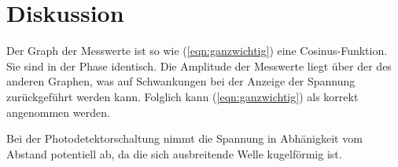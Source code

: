 \section{Diskussion}
\label{sec:Diskussion}

Der Graph der Messwerte ist so wie (\ref{eqn:ganzwichtig}) eine Cosinus-Funktion. Sie sind in der Phase identisch. Die Amplitude der Messwerte liegt über der des anderen Graphen, was auf Schwankungen bei der Anzeige der Spannung zurückgeführt werden kann.
Folglich kann (\ref{eqn:ganzwichtig}) als korrekt angenommen werden.

Bei der Photodetektorschaltung nimmt die Spannung in Abhänigkeit vom Abstand potentiell ab, da die sich ausbreitende Welle kugelförmig ist.
